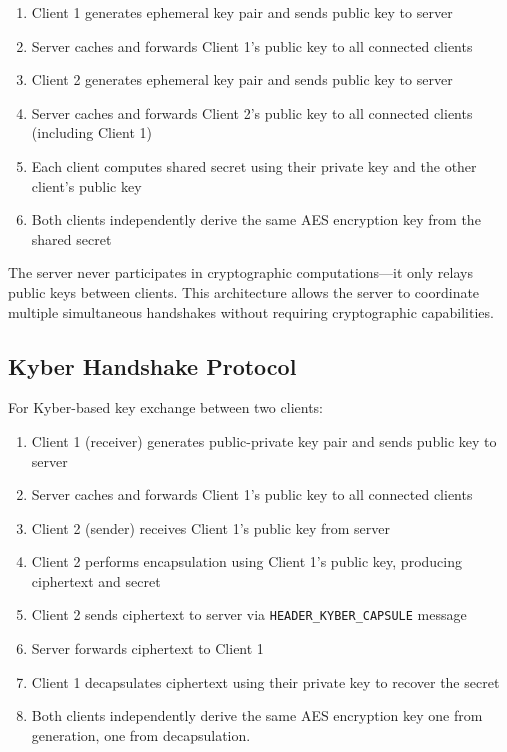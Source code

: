 \begin{enumerate}
\item Client 1 generates ephemeral key pair and sends public key to server
\item Server caches and forwards Client 1's public key to all connected clients
\item Client 2 generates ephemeral key pair and sends public key to server
\item Server caches and forwards Client 2's public key to all connected clients (including Client 1)
\item Each client computes shared secret using their private key and the other client's public key
\item Both clients independently derive the same AES encryption key from the shared secret
\end{enumerate}

The server never participates in cryptographic computations—it only relays public keys between clients. This architecture allows the server to coordinate multiple simultaneous handshakes without requiring cryptographic capabilities.

\subsection{Kyber Handshake Protocol}

For Kyber-based key exchange between two clients:

\begin{enumerate}
\item Client 1 (receiver) generates public-private key pair and sends public key to server
\item Server caches and forwards Client 1's public key to all connected clients
\item Client 2 (sender) receives Client 1's public key from server
\item Client 2 performs encapsulation using Client 1's public key, producing ciphertext and secret
\item Client 2 sends ciphertext to server via \texttt{HEADER\_KYBER\_CAPSULE} message
\item Server forwards ciphertext to Client 1
\item Client 1 decapsulates ciphertext using their private key to recover the secret
\item Both clients independently derive the same AES encryption key one from generation, one from decapsulation.
\end{enumerate}


